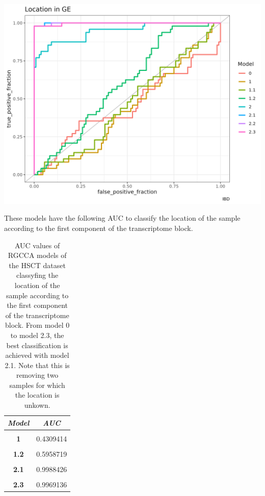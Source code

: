 \documentclass[
  12pt,
  a4paper,
  twoside,
  openright]{book}
\let\origfigure\figure
\let\endorigfigure\endfigure
\renewenvironment{figure}[1][2] {
    \expandafter\origfigure\expandafter[!htp]
} {
    \endorigfigure
}
\begin{document}
\begin{figure}
\includegraphics[width=1\linewidth]{images/hsct-auc-models} \caption[AUC of the RGCCA models in the HSCT dataset.]{AUC of the RGCCA models in the HSCT dataset. The classification of the localization of the sample according to the first component of the gene expression of the models generated with RGCCA on the HSCT dataset.}\label{fig:hsct-auc-plot}
\end{figure}

These models have the following AUC to classify the location of the sample according to the first component of the transcriptome block.

\begin{table}[H]

\caption[AUC values of RGCCA models in the HSCT dataset.]{\label{tab:hsct-auc}AUC values of RGCCA models of the HSCT dataset classyfing the location of the sample according to the first component of the transcriptome block. From model 0 to model 2.3, the best classification is achieved with model 2.1. Note that this is removing two samples for which the location is unkown.}
\centering
\begin{tabular}[t]{|>{}c|>{}c|}
\hline
\em{\textbf{Model}} & \em{\textbf{AUC}}\\
\hline
\textbf{\cellcolor{gray!6}{0}} & \cellcolor{gray!6}{0.4537037}\\
\hline
\textbf{1} & 0.4309414\\
\hline
\textbf{\cellcolor{gray!6}{1.1}} & \cellcolor{gray!6}{0.4639275}\\
\hline
\textbf{1.2} & 0.5958719\\
\hline
\textbf{\cellcolor{gray!6}{2}} & \cellcolor{gray!6}{0.9450231}\\
\hline
\textbf{2.1} & 0.9988426\\
\hline
\textbf{\cellcolor{gray!6}{2.2}} & \cellcolor{gray!6}{0.9980710}\\
\hline
\textbf{2.3} & 0.9969136\\
\hline
\end{tabular}
\end{table}
\end{document}
